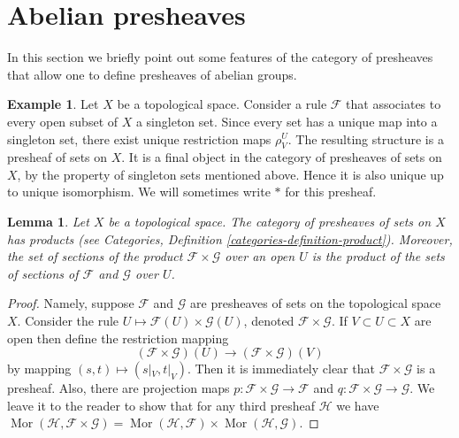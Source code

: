 \documentclass{stacks-project}
\theoremstyle{plain}
\newtheorem{lemma}[subsection]{Lemma}
\theoremstyle{definition}
\newtheorem{example}[subsection]{Example}
\theoremstyle{remark}
\numberwithin{equation}{subsection}
\def\Mor{\mathop{\mathrm{Mor}}\nolimits}
\begin{document}
\section{Abelian presheaves}
\label{section-abelian-presheaves}

\noindent
In this section we briefly point out some features of the
category of presheaves that allow one to define presheaves
of abelian groups.

\begin{example}
\label{example-singleton-presheaf}
Let $X$ be a topological space. Consider a rule $\mathcal{F}$ that
associates to every open subset of $X$ a singleton set. Since every set
has a unique map into a singleton set, there exist unique restriction
maps $\rho^U_V$. The resulting structure is a presheaf of sets on $X$.
It is a final object in the category of presheaves of sets on $X$, by the
property of singleton sets mentioned above. Hence it is
also unique up to unique isomorphism. We will sometimes write $*$
for this presheaf.
\end{example}

\begin{lemma}
\label{lemma-product-presheaves}
Let $X$ be a topological space. The category of presheaves of sets
on $X$ has products (see
Categories, Definition \ref{categories-definition-product}).
Moreover, the set of
sections of the product $\mathcal{F} \times \mathcal{G}$
over an open $U$ is the product of the sets of sections of
$\mathcal{F}$ and $\mathcal{G}$ over $U$.
\end{lemma}

\begin{proof}
Namely, suppose $\mathcal{F}$ and $\mathcal{G}$ are
presheaves of sets on the topological space $X$.
Consider the rule $U \mapsto \mathcal{F}(U) \times \mathcal{G}(U)$,
denoted $\mathcal{F} \times \mathcal{G}$. If $V \subset U \subset X$
are open then define the restriction mapping
$$
(\mathcal{F} \times \mathcal{G})(U)
\longrightarrow
(\mathcal{F} \times \mathcal{G})(V)
$$
by mapping $(s, t) \mapsto (s|_V, t|_V)$. Then it is immediately
clear that $\mathcal{F} \times \mathcal{G}$ is a presheaf.
Also, there are projection maps
$p : \mathcal{F} \times \mathcal{G} \to \mathcal{F}$
and
$q : \mathcal{F} \times \mathcal{G} \to \mathcal{G}$.
We leave it to the reader to show that
for any third presheaf $\mathcal{H}$ we have
$\Mor(\mathcal{H}, \mathcal{F} \times \mathcal{G})
= \Mor(\mathcal{H}, \mathcal{F}) \times
\Mor(\mathcal{H}, \mathcal{G})$.
\end{proof}
\end{document}
